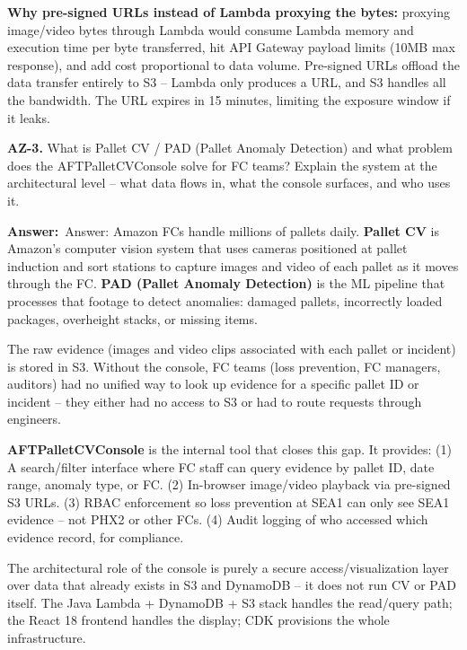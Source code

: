 \documentclass[letterpaper,10pt]{article}
\newlength{\boxwidth}
\newcommand{\answerlabel}{\noindent\textbf{\textcolor{answerblue}{Answer:}}~}
\begin{document}
\textbf{Why pre-signed URLs instead of Lambda proxying the bytes:} proxying image/video bytes through Lambda would consume Lambda memory and execution time per byte transferred, hit API Gateway payload limits (10MB max response), and add cost proportional to data volume. Pre-signed URLs offload the data transfer entirely to S3 -- Lambda only produces a URL, and S3 handles all the bandwidth. The URL expires in 15 minutes, limiting the exposure window if it leaks.

\vspace{6pt}

\colorbox{qbg}{\begin{minipage}{\boxwidth}
\textbf{AZ-3.} What is Pallet CV / PAD (Pallet Anomaly Detection) and what problem does the AFTPalletCVConsole solve for FC teams? Explain the system at the architectural level -- what data flows in, what the console surfaces, and who uses it.
\end{minipage}}

\vspace{2pt}
\answerlabel{Answer:} Amazon FCs handle millions of pallets daily. \textbf{Pallet CV} is Amazon's computer vision system that uses cameras positioned at pallet induction and sort stations to capture images and video of each pallet as it moves through the FC. \textbf{PAD (Pallet Anomaly Detection)} is the ML pipeline that processes that footage to detect anomalies: damaged pallets, incorrectly loaded packages, overheight stacks, or missing items.

The raw evidence (images and video clips associated with each pallet or incident) is stored in S3. Without the console, FC teams (loss prevention, FC managers, auditors) had no unified way to look up evidence for a specific pallet ID or incident -- they either had no access to S3 or had to route requests through engineers.

\textbf{AFTPalletCVConsole} is the internal tool that closes this gap. It provides: (1) A search/filter interface where FC staff can query evidence by pallet ID, date range, anomaly type, or FC. (2) In-browser image/video playback via pre-signed S3 URLs. (3) RBAC enforcement so loss prevention at SEA1 can only see SEA1 evidence -- not PHX2 or other FCs. (4) Audit logging of who accessed which evidence record, for compliance.

The architectural role of the console is purely a secure access/visualization layer over data that already exists in S3 and DynamoDB -- it does not run CV or PAD itself. The Java Lambda + DynamoDB + S3 stack handles the read/query path; the React 18 frontend handles the display; CDK provisions the whole infrastructure.
\end{document}
